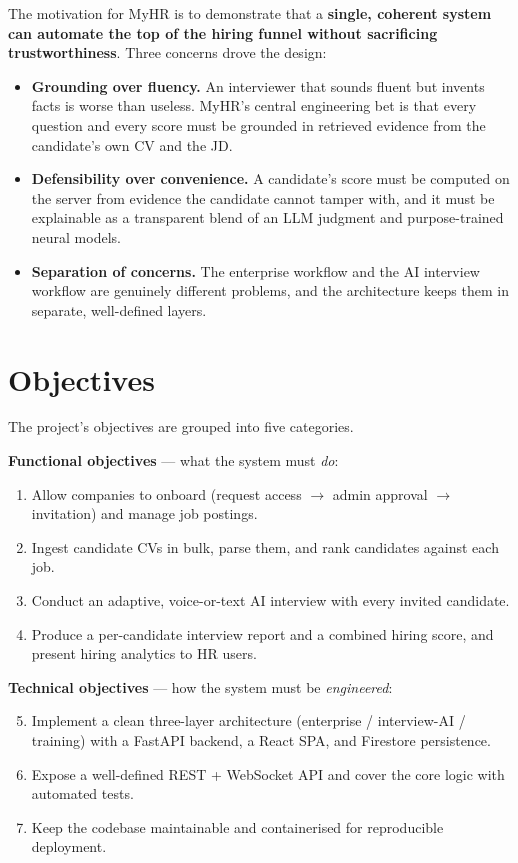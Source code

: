 \documentclass[12pt,a4paper,oneside]{report}
\begin{document}
The motivation for MyHR is to demonstrate that a \textbf{single, coherent system can automate
the top of the hiring funnel without sacrificing trustworthiness}. Three concerns drove the
design:

\begin{itemize}
  \item \textbf{Grounding over fluency.} An interviewer that sounds fluent but invents facts
    is worse than useless. MyHR's central engineering bet is that every question and every
    score must be grounded in retrieved evidence from the candidate's own CV and the JD.
  \item \textbf{Defensibility over convenience.} A candidate's score must be computed on the
    server from evidence the candidate cannot tamper with, and it must be explainable as a
    transparent blend of an LLM judgment and purpose-trained neural models.
  \item \textbf{Separation of concerns.} The enterprise workflow and the AI interview workflow
    are genuinely different problems, and the architecture keeps them in separate, well-defined
    layers.
\end{itemize}

\section{Objectives}

The project's objectives are grouped into five categories.

\textbf{Functional objectives} --- what the system must \textit{do}:

\begin{enumerate}
  \item Allow companies to onboard (request access $\to$ admin approval $\to$ invitation) and
    manage job postings.
  \item Ingest candidate CVs in bulk, parse them, and rank candidates against each job.
  \item Conduct an adaptive, voice-or-text AI interview with every invited candidate.
  \item Produce a per-candidate interview report and a combined hiring score, and present
    hiring analytics to HR users.
\end{enumerate}

\textbf{Technical objectives} --- how the system must be \textit{engineered}:

\begin{enumerate}
  \setcounter{enumi}{4}
  \item Implement a clean three-layer architecture (enterprise / interview-AI / training) with
    a FastAPI backend, a React SPA, and Firestore persistence.
  \item Expose a well-defined REST + WebSocket API and cover the core logic with automated
    tests.
  \item Keep the codebase maintainable and containerised for reproducible deployment.
\end{enumerate}
\end{document}
